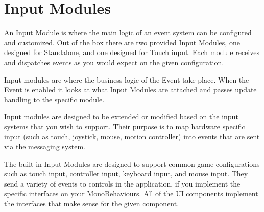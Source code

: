\chapter{Input Modules}
\hypertarget{md__hey_tea_9_2_library_2_package_cache_2com_8unity_8ugui_0d1_80_80_2_documentation_0i_2_input_modules}{}\label{md__hey_tea_9_2_library_2_package_cache_2com_8unity_8ugui_0d1_80_80_2_documentation_0i_2_input_modules}
\label{md__hey_tea_9_2_library_2_package_cache_2com_8unity_8ugui_0d1_80_80_2_documentation_0i_2_input_modules_autotoc_md4837}%
%
 An Input Module is where the main logic of an event system can be configured and customized. Out of the box there are two provided Input Modules, one designed for Standalone, and one designed for Touch input. Each module receives and dispatches events as you would expect on the given configuration.

Input modules are where the \textquotesingle{}business logic\textquotesingle{} of the Event  take place. When the Event  is enabled it looks at what Input Modules are attached and passes update handling to the specific module.

Input modules are designed to be extended or modified based on the input systems that you wish to support. Their purpose is to map hardware specific input (such as touch, joystick, mouse, motion controller) into events that are sent via the messaging system.

The built in Input Modules are designed to support common game configurations such as touch input, controller input, keyboard input, and mouse input. They send a variety of events to controls in the application, if you implement the specific interfaces on your Mono\+Behaviours. All of the UI components implement the interfaces that make sense for the given component. 